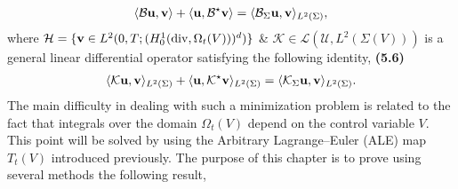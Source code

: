 \documentclass[oneside]{book}
\numberwithin{equation}{section}
\begin{document}
\begin{align*}
	\langle\mathcal{B}{\bf u},{\bf v}\rangle + \langle{\bf u},\mathcal{B}^\star{\bf v}\rangle = \langle\mathcal{B}_\Sigma{\bf u},{\bf v}\rangle_{L^2(\Sigma)},
\end{align*}
where $\mathcal{H} = \{{\bf v}\in L^2(0,T;(H_0^1({\rm div},\Omega_t(V)))^d)\}$ \& $\mathcal{K}\in\mathcal{L}(\mathcal{U},L^2(\Sigma(V)))$ is a general linear differential operator satisfying the following identity, \textbf{(5.6)}
\begin{align*}
	\langle\mathcal{K}{\bf u},{\bf v}\rangle_{L^2(\Sigma)} + \langle{\bf u},\mathcal{K}^\star{\bf v}\rangle_{L^2(\Sigma)} = \langle\mathcal{K}_\Sigma{\bf u},{\bf v}\rangle_{L^2(\Sigma)}.
\end{align*}
The main difficulty in dealing with such a minimization problem is related to the fact that integrals over the domain $\Omega_t(V)$ depend on the control variable $V$. This point will be solved by using the Arbitrary Lagrange--Euler (ALE) map $T_t(V)$ introduced previously. The purpose of this chapter is to prove using several methods the following result,
\end{document}
